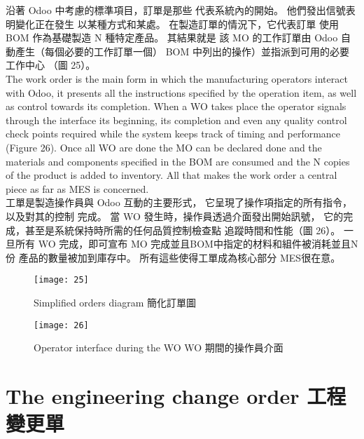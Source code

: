 \fontsize{12}{2.5pt}\sectionef  
{沿著 Odoo 中考慮的標準項目，訂單是那些
代表系統內的開始。 他們發出信號表明變化正在發生
以某種方式和某處。 在製造訂單的情況下，它代表訂單
使用 BOM 作為基礎製造 N 種特定產品。 其結果就是
該 MO 的工作訂單由 Odoo 自動產生（每個必要的工作訂單一個）
BOM 中列出的操作）並指派到可用的必要工作中心
（圖 25）。}\\[15pt]

\fontsize{12}{2.5pt}\sectionef 
 {The work order is the main form in which the manufacturing operators interact with Odoo,
it presents all the instructions specified by the operation item, as well as control towards its
completion. When a WO takes place the operator signals through the interface its beginning,
its completion and even any quality control check points required while the system keeps
track of timing and performance (Figure 26). Once all WO are done the MO can be declared
done and the materials and components specified in the BOM are consumed and the N copies
of the product is added to inventory. All that makes the work order a central piece as far as
MES is concerned.  }\\[1pt]

\fontsize{12}{2.5pt}\sectionef  
{工單是製造操作員與 Odoo 互動的主要形式，
它呈現了操作項指定的所有指令，以及對其的控制
完成。 當 WO 發生時，操作員透過介面發出開始訊號，
它的完成，甚至是系統保持時所需的任何品質控制檢查點
追蹤時間和性能（圖 26）。 一旦所有 WO 完成，即可宣布 MO
完成並且BOM中指定的材料和組件被消耗並且N份
產品的數量被加到庫存中。 所有這些使得工單成為核心部分
MES很在意。}\\[15pt]

\begin{figure}[hbt!]
\begin{center}
\texttt{[image: 25]}
\caption{\Large Simplified orders diagram  簡化訂單圖}\label{fig.25}
\end{center}
\end{figure}

\begin{figure}[hbt!]
\begin{center}
\texttt{[image: 26]}
\caption{\Large Operator interface during the WO  WO 期間的操作員介面}\label{fig.26}
\end{center}
\end{figure}


\section{ The engineering change order 工程變更單 }

